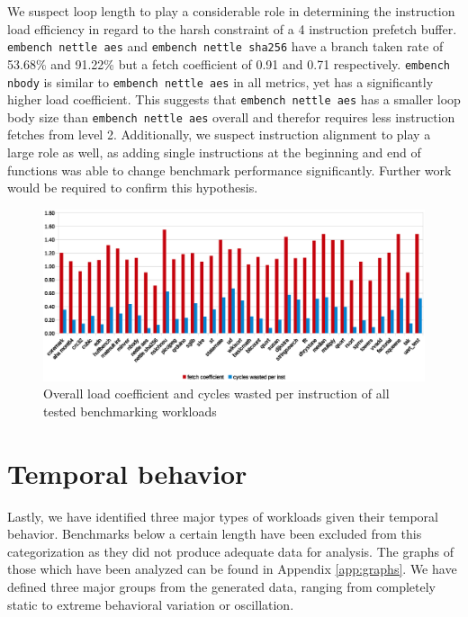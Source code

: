 \documentclass[../bachelor_paper.tex]{subfiles}
\begin{document}
We suspect loop length to play a considerable role in determining the instruction load efficiency in regard to the harsh constraint of a 4 instruction prefetch buffer. \texttt{embench nettle aes} and \texttt{embench nettle sha256} have a branch taken rate of 53.68\% and 91.22\% but a fetch coefficient of 0.91 and 0.71 respectively. \texttt{embench nbody} is similar to \texttt{embench nettle aes} in all metrics, yet has a significantly higher load coefficient. This suggests that \texttt{embench nettle aes} has a smaller loop body size than \texttt{embench nettle aes} overall and therefor requires less instruction fetches from level 2. Additionally, we suspect instruction alignment to play a large role as well, as adding single instructions at the beginning and end of functions was able to change benchmark performance significantly. Further work would be required to confirm this hypothesis.

\begin{figure}
    \centering
    \includegraphics[width=\textwidth]{img/graph/overall_fetch_waste.eps}
    \caption{Overall load coefficient and cycles wasted per instruction of all tested benchmarking workloads}
    \label{fig:res/overall/fetch_waste}
\end{figure}

\section{Temporal behavior}
Lastly, we have identified three major types of workloads given their temporal behavior. Benchmarks below a certain length have been excluded from this categorization as they did not produce adequate data for analysis. The graphs of those which have been analyzed can be found in Appendix \ref{app:graphs}. We have defined three major groups from the generated data, ranging from completely static to extreme behavioral variation or oscillation.
\end{document}
